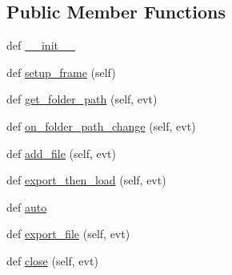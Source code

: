 \subsection*{Public Member Functions}
\begin{DoxyCompactItemize}
\item 
def \hyperlink{class_uni_dec_1_1import__wizard_1_1_import_wizard_af3794424db3ccd37b1ce46ff74e22237}{\+\_\+\+\_\+init\+\_\+\+\_\+}
\item 
def \hyperlink{class_uni_dec_1_1import__wizard_1_1_import_wizard_a421eaa4d5335e45b52a95ddf7dd0c89d}{setup\+\_\+frame} (self)
\item 
def \hyperlink{class_uni_dec_1_1import__wizard_1_1_import_wizard_a33e938d5cb0f6e4196ddf79a0d05ca8b}{get\+\_\+folder\+\_\+path} (self, evt)
\item 
def \hyperlink{class_uni_dec_1_1import__wizard_1_1_import_wizard_a479cbf706652bc0c5518dd8c0adce7ee}{on\+\_\+folder\+\_\+path\+\_\+change} (self, evt)
\item 
def \hyperlink{class_uni_dec_1_1import__wizard_1_1_import_wizard_a70a95bffdb6891ece4bfd27921b9978c}{add\+\_\+file} (self, evt)
\item 
def \hyperlink{class_uni_dec_1_1import__wizard_1_1_import_wizard_a479ed3812053fe687a811b640c724681}{export\+\_\+then\+\_\+load} (self, evt)
\item 
def \hyperlink{class_uni_dec_1_1import__wizard_1_1_import_wizard_ad141f39dd10cc20ef89f7bef552c26a8}{auto}
\item 
def \hyperlink{class_uni_dec_1_1import__wizard_1_1_import_wizard_a986de263af707160d4b7e3427e555b3b}{export\+\_\+file} (self, evt)
\item 
def \hyperlink{class_uni_dec_1_1import__wizard_1_1_import_wizard_a23bdb87d7f3ab201631c430f906dbfdf}{close} (self, evt)
\end{DoxyCompactItemize}
